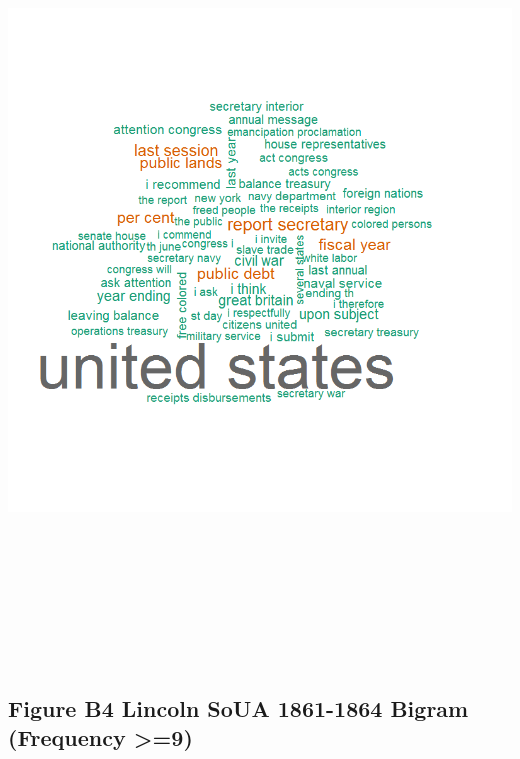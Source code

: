 \documentclass[]{article}
\begin{document}
\includegraphics[height=8.33333in]{images/Lincolndata_bigram_wc.png}

\vfill

\subsection{Figure B4 Lincoln SoUA 1861-1864 Bigram (Frequency
\textgreater{}=9)}\label{figure-b4-lincoln-soua-1861-1864-bigram-frequency-9}
\end{document}
